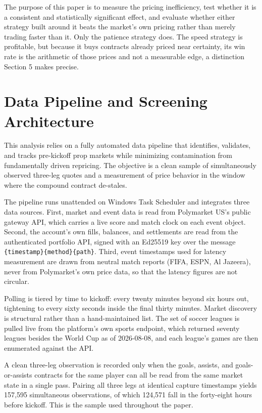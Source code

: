\documentclass[12pt]{article}
\begin{document}
The purpose of this paper is to measure the pricing inefficiency, test whether it
is a consistent and statistically significant effect, and evaluate whether either
strategy built around it beats the market's own pricing rather than merely
trading faster than it. Only the patience strategy does. The speed strategy is
profitable, but because it buys contracts already priced near certainty, its win
rate is the arithmetic of those prices and not a measurable edge, a distinction
Section 5 makes precise.

\section{Data Pipeline and Screening Architecture}

This analysis relies on a fully automated data pipeline that identifies,
validates, and tracks pre-kickoff prop markets while minimizing contamination
from fundamentally driven repricing. The objective is a clean sample of
simultaneously observed three-leg quotes and a measurement of price behavior in
the window where the compound contract de-stales.

The pipeline runs unattended on Windows Task Scheduler and integrates three data
sources. First, market and event data is read from Polymarket US's public gateway
API, which carries a live score and match clock on each event object. Second, the
account's own fills, balances, and settlements are read from the authenticated
portfolio API, signed with an Ed25519 key over the message
\texttt{\{timestamp\}\{method\}\{path\}}. Third, event timestamps used for latency
measurement are drawn from neutral match reports (FIFA, ESPN, Al Jazeera), never
from Polymarket's own price data, so that the latency figures are not circular.

Polling is tiered by time to kickoff: every twenty minutes beyond six hours out,
tightening to every sixty seconds inside the final thirty minutes. Market
discovery is structural rather than a hand-maintained list. The set of soccer
leagues is pulled live from the platform's own sports endpoint, which returned
seventy leagues besides the World Cup as of 2026-08-08, and each league's games
are then enumerated against the API.

A clean three-leg observation is recorded only when the goals, assists, and
goals-or-assists contracts for the same player can all be read from the same
market state in a single pass. Pairing all three legs at identical capture
timestamps yields 157{,}595 simultaneous observations, of which 124{,}571 fall in
the forty-eight hours before kickoff. This is the sample used throughout the
paper.
\end{document}

